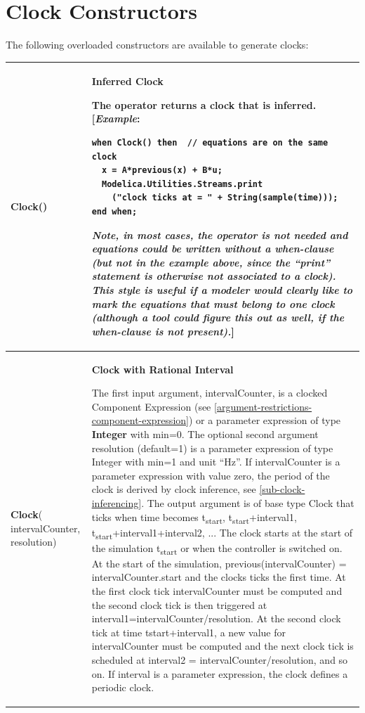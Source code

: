 \documentclass[10pt,a4paper]{report}
\def\doublelabel#1{\label{#1}\hypertarget{#1}{}}
\begin{document}
\section{Clock Constructors}\doublelabel{clock-constructors}

The following overloaded constructors are available to generate clocks:

\begin{longtable}[]{|p{2cm}|p{12cm}|}
\hline
\endhead
\textbf{Clock}()
&
\textbf{Inferred Clock}\newline

The operator returns a clock that is inferred.
{[}\emph{Example}:
\begin{lstlisting}[language=modelica]
when Clock() then  // equations are on the same clock     
  x = A*previous(x) + B*u;     
  Modelica.Utilities.Streams.print          
    ("clock ticks at = " + String(sample(time)));   
end when; 
\end{lstlisting}
\emph{Note, in most cases, the operator is not needed and equations
could be written without a when-clause (but not in the example above,
since the ``print'' statement is otherwise not associated to a clock).
This style is useful if a modeler would clearly like to mark the
equations that must belong to one clock (although a tool could figure
this out as well, if the when-clause is not present).}{]}
\\ \hline
\textbf{Clock}( intervalCounter,
resolution)
&
\textbf{Clock with Rational Interval}\newline

The first input argument, intervalCounter, is a clocked Component
Expression (see \ref{argument-restrictions-component-expression}) or a parameter expression of type
\textbf{Integer} with min=0. The optional second argument resolution
(default=1) is a parameter expression of type Integer with min=1 and
unit ``Hz''. If intervalCounter is a parameter expression with value
zero, the period of the clock is derived by clock inference, see 
\ref{sub-clock-inferencing}. The output argument is of base type Clock that ticks when time
becomes t\textsubscript{start}, t\textsubscript{start}+interval1,
t\textsubscript{start}+interval1+interval2, ... The clock starts at the
start of the simulation t\textsubscript{start} or when the controller is
switched on. At the start of the simulation, previous(intervalCounter) =
intervalCounter.start and the clocks ticks the first time. At the first
clock tick intervalCounter must be computed and the second clock tick is
then triggered at interval1=intervalCounter/resolution. At the second
clock tick at time tstart+interval1, a new value for intervalCounter
must be computed and the next clock tick is scheduled at interval2 =
intervalCounter/resolution, and so on. If interval is a parameter
expression, the clock defines a periodic clock.


\end{longtable}
\end{document}
